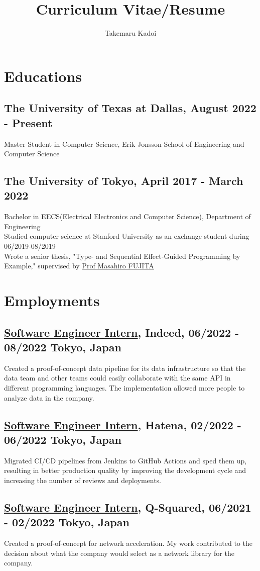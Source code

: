 \documentclass[10pt]{article}
\title{\vspace{-1cm}Curriculum Vitae/Resume}
\author{Takemaru Kadoi}
\date{}
\begin{document}
\section*{Educations}
  \subsection*{The University of Texas at Dallas, August 2022 - Present}
    Master Student in Computer Science, Erik Jonsson School of Engineering and Computer Science
  \subsection*{The University of Tokyo, April 2017 - March 2022}
    Bachelor in EECS(Electrical Electronics and Computer Science), Department of Engineering
    \\
    Studied computer science at Stanford University as an exchange student during 06/2019-08/2019
    \\
    Wrote a senior thesis, "Type- and Sequential Effect-Guided Programming by Example," supervised by \href{https://scholar.google.com/citations?user=tYabznkAAAAJ}{Prof Masahiro FUJITA}

\section*{Employments}
  \subsection*{\underline{Software Engineer Intern}, Indeed, 06/2022 - 08/2022 \hfill Tokyo, Japan}
    Created a proof-of-concept data pipeline for its data infrastructure so that the data team and other teams could easily collaborate with the same API in different programming languages.
    The implementation allowed more people to analyze data in the company.
  \subsection*{\underline{Software Engineer Intern}, Hatena, 02/2022 - 06/2022 \hfill Tokyo, Japan}
    Migrated CI/CD pipelines from Jenkins to GitHub Actions and sped them up, resulting in better production quality by improving the development cycle and increasing the number of reviews and deployments.
  \subsection*{\underline{Software Engineer Intern}, Q-Squared, 06/2021 - 02/2022 \hfill Tokyo, Japan}
    Created a proof-of-concept for network acceleration.
    My work contributed to the decision about what the company would select as a network library for the company.
\end{document}
